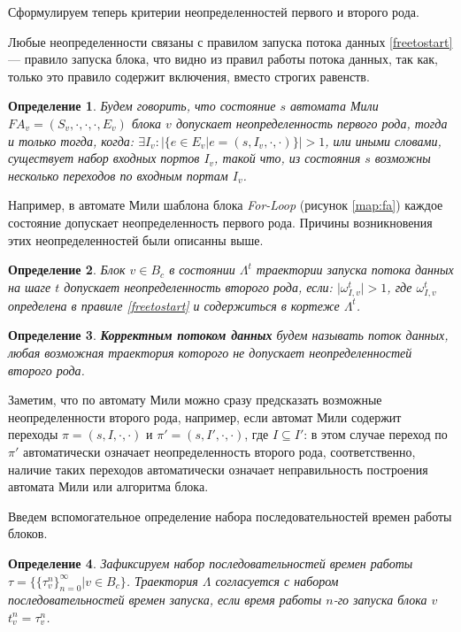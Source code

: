 \documentclass[10pt,a4paper]{article}
\newtheorem{defen}{Определение}
\newcommand{\FA}{F\!A}
\begin{document}
  Сформулируем теперь критерии неопределенностей первого и второго рода.
  
  Любые неопределенности связаны с правилом запуска потока данных \eqref{freetostart} --- правило запуска блока, что видно из правил работы потока данных, так как,
  только это правило содержит включения, вместо строгих равенств.
  \begin{defen}
    Будем говорить, что состояние $s$ автомата Мили $\FA_v = (S_v, \cdot, \cdot, \cdot, E_v)$ блока $v$ допускает неопределенность первого рода, тогда и только тогда, когда:
    $\exists I_v: \lvert \{e \in E_v \vert e = (s, I_v, \cdot, \cdot) \} \rvert > 1$, или иными словами, существует набор входных портов $I_v$, такой что, из состояния $s$ возможны
    несколько переходов по входным портам $I_v$.
  \end{defen}
  
  Например, в автомате Мили шаблона блока \textit{For-Loop} (рисунок \ref{map:fa}) каждое состояние допускает неопределенность первого рода.
  Причины возникновения этих неопределенностей были описанны выше.
 
  \begin{defen}
    Блок $v \in B_c$ в состоянии $\Lambda^t$ траектории запуска потока данных на шаге $t$ допускает неопределенность второго рода, если:
    $\lvert \omega^t_{I, v} \rvert > 1$, где $\omega^t_{I, v}$ определена в правиле \eqref{freetostart} и содержиться в кортеже $\Lambda^t$.
  \end{defen}
  
  \begin{defen}
    \textbf{Корректным потоком данных} будем называть поток данных, любая возможная траектория которого не допускает неопределенностей второго рода.
  \end{defen}
  
  Заметим, что по автомату Мили можно сразу предсказать возможные неопределенности второго рода, например, если автомат Мили содержит переходы
  $\pi = (s, I, \cdot, \cdot)$ и $\pi' = (s, I', \cdot, \cdot)$,
  где $I \subseteq I'$: в этом случае переход по $\pi'$ автоматически означает неопределенность второго рода,
  соответственно, наличие таких переходов автоматически означает неправильность построения автомата Мили или алгоритма блока.
  
  Введем вспомогательное определение набора последовательностей времен работы блоков.
  \begin{defen}
    Зафиксируем набор последовательностей времен работы $\tau = \{\{\tau^n_v\}^{\infty}_{n = 0} \vert v \in B_c\}$.
    Траектория $\Lambda$ согласуется с набором последовательностей времен запуска, если время работы $n$-го запуска блока $v$ $t^n_v = \tau^n_v$.
  \end{defen}
  
\end{document}
